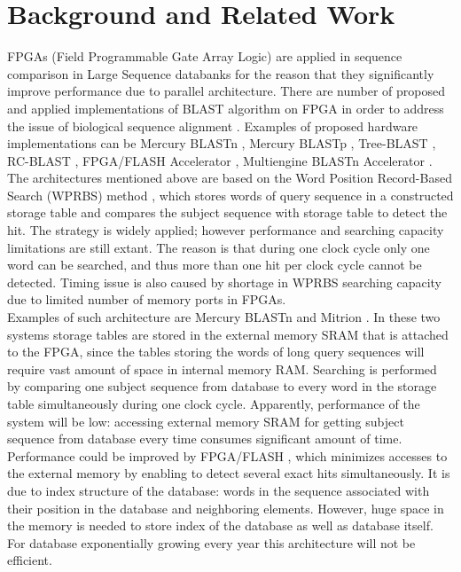 \section{Background and Related Work}
\label{sec:background}

FPGAs (Field Programmable Gate Array Logic) are applied in sequence comparison in Large Sequence databanks for the reason that they significantly improve performance due to parallel architecture. There are number of proposed and applied implementations of BLAST algorithm on FPGA in order to address the issue of biological sequence alignment \cite{oliver2005hyper}. Examples of proposed hardware implementations can be Mercury BLASTn \cite{buhler2007mercury}, Mercury BLASTp \cite{harris2007banded}, Tree-BLAST \cite{herbordt2006single}, RC-BLAST \cite{datta2009rc}, FPGA/FLASH Accelerator \cite{lavenier2007reconfigurable}, Multiengine BLASTn Accelerator \cite{sotiriades2007design}. 
\\
The architectures mentioned above are based on the Word Position Record-Based Search (WPRBS) method \cite{guo2012systolic}, which stores words of query sequence in a constructed storage table and compares the subject sequence with storage table to detect the hit. The strategy is widely applied; however performance and searching capacity limitations are still extant. The reason is that during one clock cycle only one word can be searched, and thus more than one hit per clock cycle cannot be detected. Timing issue is also caused by shortage in WPRBS searching capacity due to limited number of memory ports in FPGAs.
\\
Examples of such architecture are Mercury BLASTn \cite{buhler2007mercury} and Mitrion \cite{guo2012systolic}. In these two systems storage tables are stored in the external memory SRAM that is attached to the FPGA, since the tables storing the words of long query sequences will require vast amount of space in internal memory RAM. Searching is performed by comparing one subject sequence from database to every word in the storage table simultaneously during one clock cycle. Apparently, performance of the system will be low: accessing external memory SRAM for getting subject sequence from database every time consumes significant amount of time.    
\\    
Performance could be improved by FPGA/FLASH \cite{lavenier2007reconfigurable}, which minimizes accesses to the external memory by enabling to detect several exact hits simultaneously. It is due to index structure of the database: words in the sequence associated with their position in the database and neighboring elements. However, huge space in the memory is needed to store index of the database as well as database itself. For database exponentially growing every year this architecture will not be efficient. 
